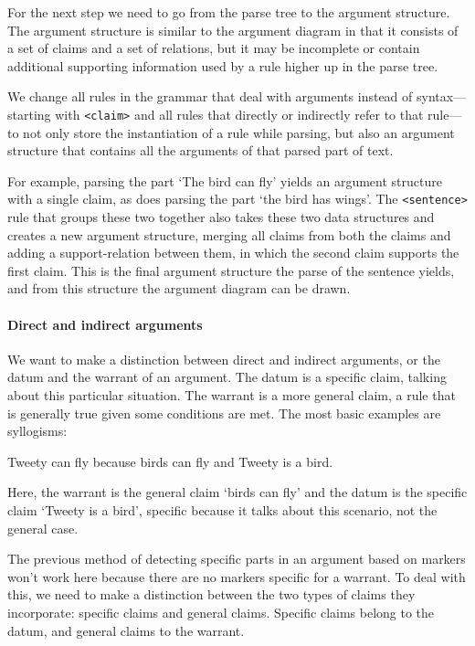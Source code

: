For the next step we need to go from the parse tree to the argument structure. The argument structure is similar to the argument diagram in that it consists of a set of claims and a set of relations, but it may be incomplete or contain additional supporting information used by a rule higher up in the parse tree.

We change all rules in the grammar that deal with arguments instead of syntax---starting with \texttt{<claim>} and all rules that directly or indirectly refer to that rule---to not only store the instantiation of a rule while parsing, but also an argument structure that contains all the arguments of that parsed part of text.

For example, parsing the part `The bird can fly' yields an argument structure with a single claim, as does parsing the part `the bird has wings'. The \texttt{<sentence>} rule that groups these two together also takes these two data structures and creates a new argument structure, merging all claims from both the claims and adding a support-relation between them, in which the second claim supports the first claim. This is the final argument structure the parse of the sentence yields, and from this structure the argument diagram can be drawn.

\paragraph{Direct and indirect arguments}
 
We want to make a distinction between direct and indirect arguments, or the datum and the warrant of an argument. The datum is a specific claim, talking about this particular situation. The warrant is a more general claim, a rule that is generally true given some conditions are met. The most basic examples are syllogisms:

\begin{exe}
	\ex Tweety can fly because birds can fly and Tweety is a bird.
\end{exe}

\noindent Here, the warrant is the general claim `birds can fly' and the datum is the specific claim `Tweety is a bird', specific because it talks about this scenario, not the general case.

The previous method of detecting specific parts in an argument based on markers won't work here because there are no markers specific for a warrant. To deal with this, we need to make a distinction between the two types of claims they incorporate: specific claims and general claims. Specific claims belong to the datum, and general claims to the warrant.

